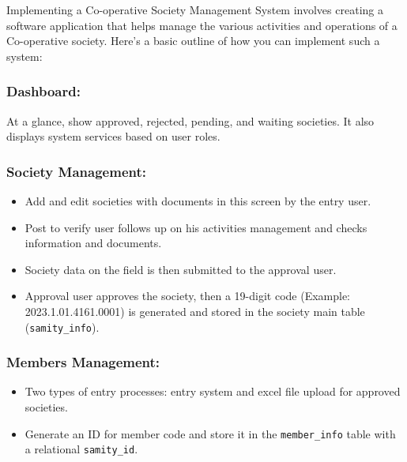 Implementing a Co-operative Society Management System involves creating a software 
application that helps manage the various activities and operations of a Co-operative society. 
Here's a basic outline of how you can implement such a system:

\subsubsection*{Dashboard:}
At a glance, show approved, rejected, pending, and waiting societies. It also displays system services based on user roles.

\subsubsection*{Society Management:}
\begin{itemize}
    \item Add and edit societies with documents in this screen by the entry user.
    \item Post to verify user follows up on his activities management and checks information and documents.
    \item Society data on the field is then submitted to the approval user.
    \item Approval user approves the society, then a 19-digit code (Example: 2023.1.01.4161.0001) is generated and stored in the society main table (\texttt{samity\_info}).
\end{itemize}

\subsubsection*{Members Management:}
\begin{itemize}
    \item Two types of entry processes: entry system and excel file upload for approved societies.
    \item Generate an ID for member code and store it in the \texttt{member\_info} table with a relational \texttt{samity\_id}.
\end{itemize}

